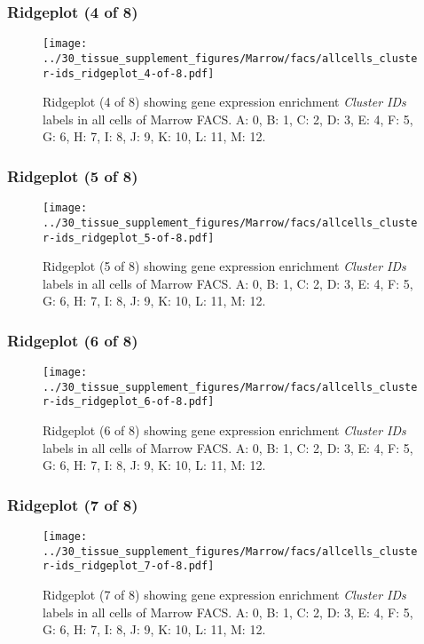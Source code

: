 \clearpage

\subsubsection{Ridgeplot (4 of 8)}
\begin{figure}[h]
\centering
\texttt{[image: ../30\_tissue\_supplement\_figures/Marrow/facs/allcells\_cluster-ids\_ridgeplot\_4-of-8.pdf]}

\caption{ Ridgeplot (4 of 8)  showing gene expression enrichment \emph{Cluster IDs} labels in all cells of Marrow FACS. A: 0, B: 1, C: 2, D: 3, E: 4, F: 5, G: 6, H: 7, I: 8, J: 9, K: 10, L: 11, M: 12.}
\end{figure}


\clearpage

\subsubsection{Ridgeplot (5 of 8)}
\begin{figure}[h]
\centering
\texttt{[image: ../30\_tissue\_supplement\_figures/Marrow/facs/allcells\_cluster-ids\_ridgeplot\_5-of-8.pdf]}

\caption{ Ridgeplot (5 of 8)  showing gene expression enrichment \emph{Cluster IDs} labels in all cells of Marrow FACS. A: 0, B: 1, C: 2, D: 3, E: 4, F: 5, G: 6, H: 7, I: 8, J: 9, K: 10, L: 11, M: 12.}
\end{figure}


\clearpage

\subsubsection{Ridgeplot (6 of 8)}
\begin{figure}[h]
\centering
\texttt{[image: ../30\_tissue\_supplement\_figures/Marrow/facs/allcells\_cluster-ids\_ridgeplot\_6-of-8.pdf]}

\caption{ Ridgeplot (6 of 8)  showing gene expression enrichment \emph{Cluster IDs} labels in all cells of Marrow FACS. A: 0, B: 1, C: 2, D: 3, E: 4, F: 5, G: 6, H: 7, I: 8, J: 9, K: 10, L: 11, M: 12.}
\end{figure}


\clearpage

\subsubsection{Ridgeplot (7 of 8)}
\begin{figure}[h]
\centering
\texttt{[image: ../30\_tissue\_supplement\_figures/Marrow/facs/allcells\_cluster-ids\_ridgeplot\_7-of-8.pdf]}

\caption{ Ridgeplot (7 of 8)  showing gene expression enrichment \emph{Cluster IDs} labels in all cells of Marrow FACS. A: 0, B: 1, C: 2, D: 3, E: 4, F: 5, G: 6, H: 7, I: 8, J: 9, K: 10, L: 11, M: 12.}
\end{figure}



